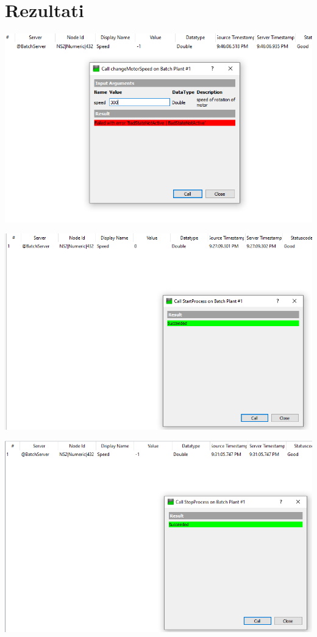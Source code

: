 \documentclass[12pt]{article}
\begin{document}
\section{Rezultati}
\begin{center}
	\includegraphics[scale=0.7]{figs/menjanjeBrzineIskljMotora.PNG}
\end{center}
\vspace{0.5cm}
\begin{center}
	\includegraphics[scale=0.7]{figs/ukljucenMotor.PNG}
\end{center}
\begin{center}
	\includegraphics[scale=0.7]{figs/gasenjeMotora.PNG}
\end{center}
\end{document}
